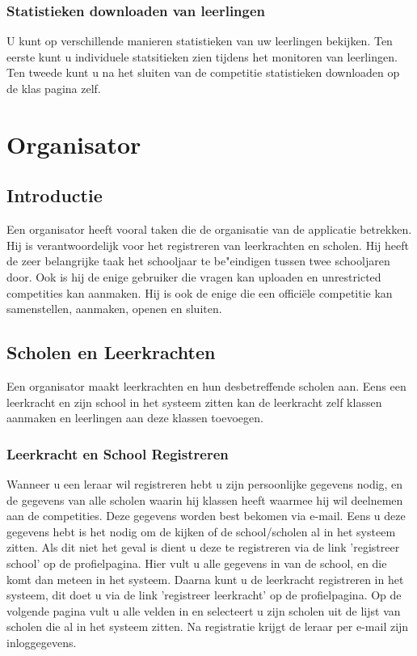 \documentclass[11pt,a4paper]{report}
\begin{document}
\subsection{Statistieken downloaden van leerlingen}
U kunt op verschillende manieren statistieken van uw leerlingen bekijken. Ten eerste kunt u individuele statsitieken zien tijdens het monitoren van leerlingen. Ten tweede kunt u na het sluiten van de competitie statistieken downloaden op de klas pagina zelf. 

\chapter{Organisator}

\section{Introductie}
Een organisator heeft vooral taken die de organisatie van de applicatie betrekken. Hij is verantwoordelijk voor het registreren van leerkrachten en scholen. Hij heeft de zeer belangrijke taak het schooljaar te be"eindigen tussen twee schooljaren door. Ook is hij de enige gebruiker die vragen kan uploaden en unrestricted competities kan aanmaken.  Hij is ook de enige die een offici\"ele competitie kan samenstellen, aanmaken, openen en sluiten.


\section{Scholen en Leerkrachten}
Een organisator maakt leerkrachten en hun desbetreffende scholen aan. Eens een leerkracht en zijn school in het systeem zitten kan de leerkracht zelf klassen aanmaken en leerlingen aan deze klassen toevoegen. 
\subsection{Leerkracht en School Registreren}
Wanneer u een leraar wil registreren hebt u zijn persoonlijke gegevens nodig, en de gegevens van alle scholen waarin hij klassen heeft waarmee hij wil deelnemen aan de competities. Deze gegevens worden best bekomen via e-mail. Eens u deze gegevens hebt is het nodig om de kijken of de school/scholen al in het systeem zitten. Als dit niet het geval is dient u deze te registreren via de link 'registreer school' op de profielpagina. Hier vult u alle gegevens in van de school, en die komt dan meteen in het systeem.
Daarna kunt u de leerkracht registreren in het systeem, dit doet u via de link 'registreer leerkracht' op de profielpagina. Op de volgende pagina vult u alle velden in en selecteert u zijn scholen uit de lijst van scholen die al in het systeem zitten. 
Na registratie krijgt de leraar per e-mail zijn inloggegevens.
\end{document}
